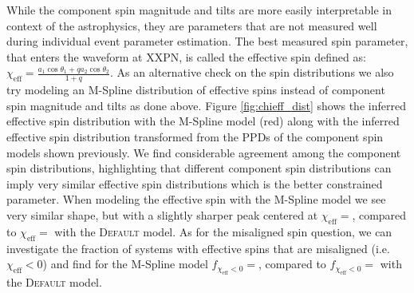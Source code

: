 While the component spin magnitude and tilts are more easily interpretable in context of the astrophysics, they are parameters that 
are not measured well during individual event parameter estimation. The best measured spin parameter, that enters the waveform at XXPN, is 
called the effective spin defined as: $\chi_\mathrm{eff} = \frac{a_1\cos{\theta_1} + qa_2\cos{\theta_2}}{1+q}$. As an alternative check 
on the spin distributions we also try modeling an M-Spline distribution of effective spins instead of component spin magnitude and tilts 
as done above. Figure \ref{fig:chieff_dist} shows the inferred effective spin distribution with the M-Spline model (red) along with the 
inferred effective spin distribution transformed from the PPDs of the component spin models shown previously. We find considerable agreement 
among the component spin distributions, highlighting that different component spin distributions can imply very similar effective spin 
distributions which is the better constrained parameter. When modeling the effective spin with the M-Spline model we see very similar 
shape, but with a slightly sharper peak centered at $\chi_\mathrm{eff}=$\result{$\CIPlusMinus{\macros[ChiEffective][chieff][PeakChiEff]}$}, compared to 
$\chi_\mathrm{eff}=$\result{$\CIPlusMinus{\macros[ChiEffective][default][PeakChiEff]}$} with the \textsc{Default} model. As for the misaligned spin question, 
we can investigate the fraction of systems with effective spins that are misaligned (i.e. $\chi_\mathrm{eff}<0$) and find for the M-Spline 
model $f_{\chi_\mathrm{eff}<0}=$\result{$\CIPlusMinus{\macros[ChiEffective][chieff][FracBelow0]}$}, compared to 
$f_{\chi_\mathrm{eff}<0}=$\result{$\CIPlusMinus{\macros[ChiEffective][default][FracBelow0]}$} with the \textsc{Default} model.
